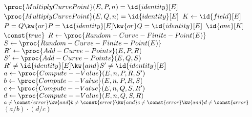 \begin{algorithm}
\begin{codebox}
\li \Assert $\proc{MultiplyCurvePoint}(E, P, n) = \id{identity}[E]$
\li \Assert $\proc{MultiplyCurvePoint}(E, Q, n) = \id{identity}[E]$
\li $K \gets \id{field}[E]$
\li \If $P = Q \kw{ or } P = \id{identity}[E] \kw{ or } Q = \id{identity}[E]$
\li     \Then
            \Return $\id{one}[K]$
        \End
\li \While $\const{true}$
\li     \Do
            $R \gets \proc{Random-Curve-Finite-Point(E)}$
\li         $S \gets \proc{Random-Curve-Finite-Point(E)}$
\li         $R' \gets \proc{Add-Curve-Points}(E, P, R)$
\li         $S' \gets \proc{Add-Curve-Points}(E, Q, S)$
\li         \If $R' \neq \id{identity}[E] \kw{ and } S' \neq \id{identity}[E]$
\li             \Then
                    $a \gets \proc{Compute--Value}(E, n, P, R, S')$
\li                 $b \gets \proc{Compute--Value}(E, n, P, R, S)$
\li                 $c \gets \proc{Compute--Value}(E, n, Q, S, R')$
\li                 $d \gets \proc{Compute--Value}(E, n, Q, S, R)$
\li                 \If $a \neq \const{error} \kw{ and } b \neq \const{error} \kw{ and } c \neq \const{error} \kw{ and } d \neq \const{error}$
\li                     \Then
                            \Return $(a / b)\cdot(d / c)$
                        \End
                \End
        \End
\end{codebox}
\end{algorithm}
